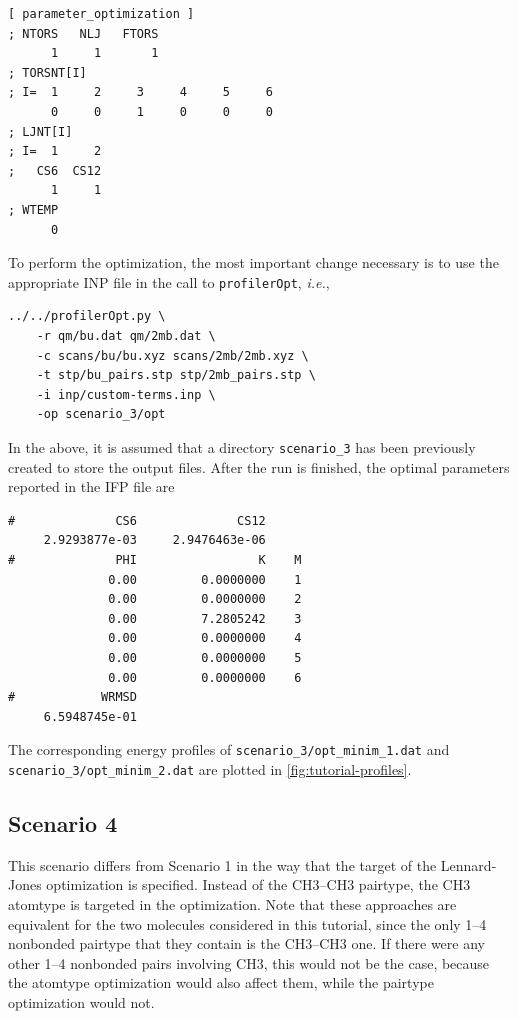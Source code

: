\documentclass[10pt,a4paper,openany]{memoir}
\numberwithin{equation}{section}
\newcommand{\under}{\_}
\newcommand{\profileropt}[0]{\texttt{profilerOpt}}
\begin{document}
\begin{lstlisting}[language=gromacs]
[ parameter_optimization ]
; NTORS   NLJ   FTORS
      1     1       1    
; TORSNT[I]
; I=  1     2     3     4     5     6
      0     0     1     0     0     0
; LJNT[I]
; I=  1     2
;   CS6  CS12
      1     1
; WTEMP
      0
\end{lstlisting}\vspace{1ex}\par

\noindent 
%
To perform the optimization, the most important change necessary is to
use the appropriate INP file in the call to \profileropt,
\textit{i.e.},

\begin{lstlisting}
../../profilerOpt.py \
    -r qm/bu.dat qm/2mb.dat \
    -c scans/bu/bu.xyz scans/2mb/2mb.xyz \
    -t stp/bu_pairs.stp stp/2mb_pairs.stp \
    -i inp/custom-terms.inp \
    -op scenario_3/opt 
\end{lstlisting}\vspace{1ex}\par

\noindent In the above, it is assumed that a directory
\texttt{scenario\under{}3} has been previously created to store the
output files.
%
After the run is finished, the optimal parameters reported in the IFP
file are

\begin{lstlisting}
#              CS6              CS12
     2.9293877e-03     2.9476463e-06
#              PHI                 K    M
              0.00         0.0000000    1
              0.00         0.0000000    2
              0.00         7.2805242    3
              0.00         0.0000000    4
              0.00         0.0000000    5
              0.00         0.0000000    6
#            WRMSD
     6.5948745e-01
\end{lstlisting}\vspace{1ex}\par

\noindent The corresponding energy profiles of
\texttt{scenario\under{}3/opt\under{}minim\under{}1.dat} and
\texttt{scenario\under{}3/opt\under{}minim\under{}2.dat} are plotted
in \autoref{fig:tutorial-profiles}.

\subsection{Scenario 4}
\label{sec:tutorial-scenario-4}

This scenario differs from Scenario 1 in the way that the target of
the Lennard-Jones optimization is specified.
%
Instead of the CH3--CH3 pairtype, the CH3 atomtype is targeted in the
optimization.
%
Note that these approaches are equivalent for the two molecules
considered in this tutorial, since the only 1--4 nonbonded pairtype
that they contain is the CH3--CH3 one.
%
If there were any other 1--4 nonbonded pairs involving CH3, this would
not be the case, because the atomtype optimization would also affect
them, while the pairtype optimization would not.
%
\end{document}
